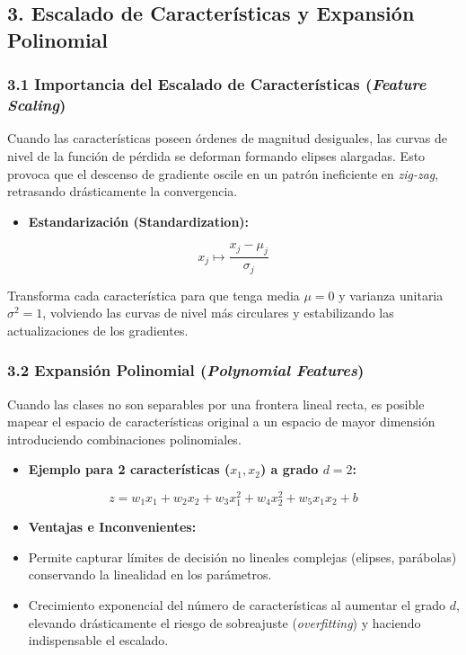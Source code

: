 \documentclass[11pt,oneside]{article}
\begin{document}
\subsection{3. Escalado de Características y Expansión Polinomial}

\subsubsection{3.1 Importancia del Escalado de Características (\emph{Feature Scaling})}

Cuando las características poseen órdenes de magnitud desiguales, las curvas de nivel de la función de pérdida se deforman formando elipses alargadas. Esto provoca que el descenso de gradiente oscile en un patrón ineficiente en \emph{zig-zag}, retrasando drásticamente la convergencia.

\begin{itemize}

\item \textbf{Estandarización (Standardization):}

\end{itemize}

\[x_j \mapsto \frac{x_j - \mu_j}{\sigma_j}\]

  Transforma cada característica para que tenga media \(\mu = 0\) y varianza unitaria \(\sigma^2 = 1\), volviendo las curvas de nivel más circulares y estabilizando las actualizaciones de los gradientes.

\subsubsection{3.2 Expansión Polinomial (\emph{Polynomial Features})}

Cuando las clases no son separables por una frontera lineal recta, es posible mapear el espacio de características original a un espacio de mayor dimensión introduciendo combinaciones polinomiales.

\begin{itemize}

\item \textbf{Ejemplo para 2 características (\(x_1, x_2\)) a grado \(d=2\):}

\end{itemize}

\[z = w_1 x_1 + w_2 x_2 + w_3 x_1^2 + w_4 x_2^2 + w_5 x_1 x_2 + b\]

\begin{itemize}

\item \textbf{Ventajas e Inconvenientes:}

\item Permite capturar límites de decisión no lineales complejas (elipses, parábolas) conservando la linealidad en los parámetros.

\item Crecimiento exponencial del número de características al aumentar el grado \(d\), elevando drásticamente el riesgo de sobreajuste (\emph{overfitting}) y haciendo indispensable el escalado.

\end{itemize}
\end{document}
